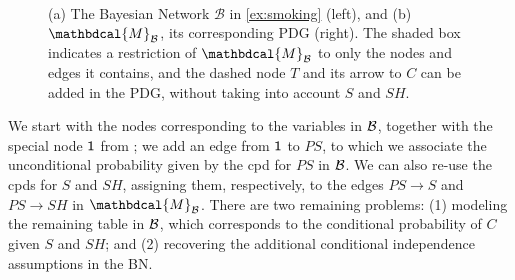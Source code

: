 \documentclass[letterpaper]{article} %
\newcommand\cmergearr[4]{
		\draw[arr,-] (#1) -- (#4) -- (#2);
		\draw[arr, shorten <=0] (#4) -- (#3);
	}
\newcommand\mergearr[3]{
		\coordinate (center-#1#2#3) at (barycentric cs:#1=1,#2=1,#3=1.2);
		\cmergearr{#1}{#2}{#3}{center-#1#2#3}
	}
\theoremstyle{plain}
\theoremstyle{definition}
\theoremstyle{remark}
\newcounter{subfigure}
\newcommand{\dg}[1]{\mathbdcal{#1}}
\newcommand{\PDGof}[1]{{\dg M}_{#1}}
\begin{document}
\begin{example}[emulating a BN]
\begin{figure}[ht!]
\fi
	\hfill~
	\label{subfig:smoking-pdg}
\addtocounter{figure}{-1}
\caption{ (a) The Bayesian Network $\mathcal B$ in \cref{ex:smoking} (left), and
(b) $\PDGof{\mathcal B}$, its corresponding PDG (right). The shaded box
indicates a restriction of $\PDGof{\mathcal B}$ to only the nodes and edges it
contains, and the dashed node $T$ and its arrow to $C$ can be added in the PDG,
without taking into account $S$ and $SH$.}
\label{fig:smoking-bn+pdg}
\end{figure}

We start with the nodes corresponding to the variables in $\cal B$, together
with the special node $\sf 1$ from ; we add an edge
from ${\sf 1}$ to $\mathit{PS}$, to which we associate the unconditional
probability given by the cpd for $\mathit{PS}$ in $\cal B$. We can also re-use
the cpds for $S$ and $\mathit{SH}$, assigning them, respectively, to the edges
$PS \to S$ and $PS \to SH$ in $\PDGof{{\mathcal B}}$.
There are two remaining problems: (1) modeling the remaining table in $\cal B$,
which corresponds to the conditional probability of $C$ given $S$ and $SH$; and
(2) recovering the additional
conditional
independence assumptions in the BN. 


\end{example}
\end{document}
